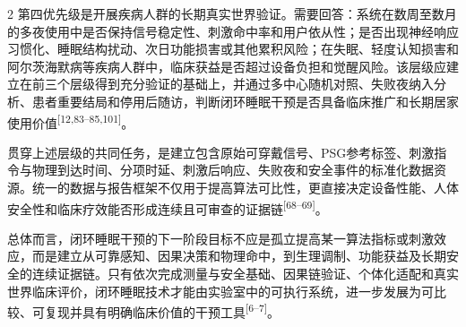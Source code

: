 \documentclass[UTF8,zihao=5,fontset=none]{ctexart}
\newcommand{\hei}{\CJKfamily{hei}}
\newcommand{\leveltwo}[1]{%
  \par\noindent{\hei\fontsize{10.5pt}{15.6pt}\selectfont\bfseries #1\par}}
\newcommand{\refcite}[1]{\nolinebreak[4]\textsuperscript{[#1]}}
\begin{document}
\begin{multicols}{2}
第四优先级是开展疾病人群的长期真实世界验证。需要回答：系统在数周至数月的多夜使用中是否保持信号稳定性、刺激命中率和用户依从性；是否出现神经响应习惯化、睡眠结构扰动、次日功能损害或其他累积风险；在失眠、轻度认知损害和阿尔茨海默病等疾病人群中，临床获益是否超过设备负担和觉醒风险。该层级应建立在前三个层级得到充分验证的基础上，并通过多中心随机对照、失败夜纳入分析、患者重要结局和停用后随访，判断闭环睡眠干预是否具备临床推广和长期居家使用价值\refcite{12,83--85,101}。\par

贯穿上述层级的共同任务，是建立包含原始可穿戴信号、PSG参考标签、刺激指令与物理到达时间、分项时延、刺激后响应、失败夜和安全事件的标准化数据资源。统一的数据与报告框架不仅用于提高算法可比性，更直接决定设备性能、人体安全性和临床疗效能否形成连续且可审查的证据链\refcite{68--69}。\par

\leveltwo{7.3 总结}

总体而言，闭环睡眠干预的下一阶段目标不应是孤立提高某一算法指标或刺激效应，而是建立从可靠感知、因果决策和物理命中，到生理调制、功能获益及长期安全的连续证据链。只有依次完成测量与安全基础、因果链验证、个体化适配和真实世界临床评价，闭环睡眠技术才能由实验室中的可执行系统，进一步发展为可比较、可复现并具有明确临床价值的干预工具\refcite{6--7}。\par



\end{multicols}
\end{document}
